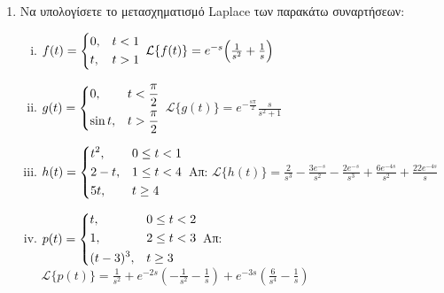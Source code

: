 \begin{enumerate}
  \item Να υπολογίσετε το μετασχηματισμό Laplace των παρακάτω συναρτήσεων:
    \begin{enumerate}[i)]
      \item $f(t)=
        \begin{dcases} 
          0, & t<1 \\ t, & t>1 
        \end{dcases}$ 
        \hfill $\mathcal{L}\{f(t)\}=e^{-s}\Bigl(\frac{1}{s^2}+\frac{1}{s}\Bigr)$

      \item $g(t)=
        \begin{dcases} 
          0, & t<\frac{\pi}{2} \\ \sin t, & t>\frac{\pi}{2}
        \end{dcases}$ 
        \hfill $\mathcal{L}\{g(t)\}=e^{-\frac{s\pi}{2}}\frac{s}{s^2+1}$

      \item $h(t)=
        \begin{dcases} 
          t^{2}, & 0\leq t<1 \\ 2-t, & 1\leq t < 4 \\ 5t, & t\geq 4
        \end{dcases}$ 
        \hfill Απ: $\mathcal{L}\{h(t)\}=\frac{2}{s^{3}}-\frac{3e^{-s}}{s^{2}}-
        \frac{2e^{-s}}{s^{3}}+\frac{6e^{-4s}}{s^{2}}+\frac{22e^{-4s}}{s}$

      \item $p(t)=
        \begin{dcases} 
          t, & 0\leq t< 2 \\ 1, & 2\leq t < 3 \\ (t-3)^{3}, & t\geq 3
        \end{dcases}$ 
        \hfill Απ: $\mathcal{L}\{p(t)\}=\frac{1}{s^{2}}+e^{-2s}
        \left(-\frac{1}{s^{2}}-\frac{1}{s}\right)+e^{-3s}
        \left(\frac{6}{s^{4}}-\frac{1}{s}\right)$
    \end{enumerate}


\end{enumerate}
